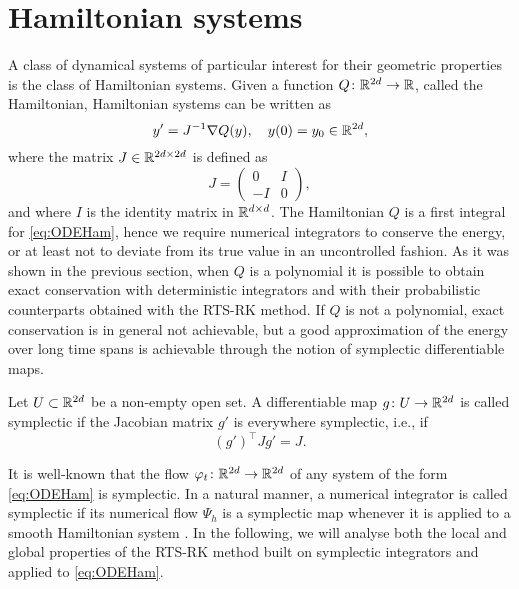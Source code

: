 \documentclass[10pt]{article}
\begin{document}
\section{Hamiltonian systems}\label{sec:Hamiltonian} A class of dynamical systems of particular interest for their geometric properties is the class of Hamiltonian systems. Given a function $Q \colon \mathbb{R}^{2d} \to \mathbb{R}$, called the Hamiltonian, Hamiltonian systems can be written as
\begin{equation}\label{eq:ODEHam}
y' = J^{-1}\nabla Q(y), \quad y(0) = y_0 \in \mathbb{R}^{2d},
\end{equation}
where the matrix $J\in\mathbb{R}^{2d \times 2d}$ is defined as
\begin{equation}
J = \begin{pmatrix} 0 & I \\ -I & 0 \end{pmatrix},
\end{equation}
and where $I$ is the identity matrix in $\mathbb{R}^{d\times d}$. The Hamiltonian $Q$ is a first integral for \eqref{eq:ODEHam}, hence we require numerical integrators to conserve the energy, or at least not to deviate from its true value in an uncontrolled fashion. As it was shown in the previous section, when $Q$ is a polynomial it is possible to obtain exact conservation with deterministic integrators and with their probabilistic counterparts obtained with the RTS-RK method. If $Q$ is not a polynomial, exact conservation is in general not achievable, but a good approximation of the energy over long time spans is achievable through the notion of symplectic differentiable maps.

\begin{definition} Let $U\subset \mathbb{R}^{2d}$ be a non-empty open set. A differentiable map $g\colon U \to \mathbb{R}^{2d}$ is called symplectic if the Jacobian matrix $g'$ is everywhere symplectic, i.e., if
	\begin{equation}\label{eq:SymplecticMap}
	(g')^\top J g' = J.
	\end{equation}	
\end{definition}
It is well-known that the flow $\varphi_t\colon\mathbb{R}^{2d}\to\mathbb{R}^{2d}$ of any system of the form \eqref{eq:ODEHam} is symplectic. In a natural manner, a numerical integrator is called symplectic if its numerical flow $\Psi_h$ is a symplectic map {whenever it is applied to a smooth Hamiltonian system \cite[Definition VI.3.1]{HLW06}}. In the following, we will analyse both the local and global properties of the RTS-RK method built on symplectic integrators and applied to \eqref{eq:ODEHam}.
\end{document}
